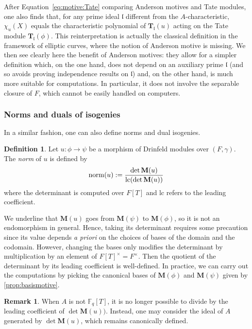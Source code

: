 \documentclass[11pt]{article}
\theoremstyle{definition}
\newtheorem{definition}[theorem]{Definition}
\newtheorem{remark}[theorem]{Remark}
\newcommand\Fq{\mathbb{F}_q}
\newcommand{\MM}{\mathbf{M}}
\newcommand{\TT}{\mathbf{T}}
\begin{document}
After Equation~\eqref{eq:motive:Tate} comparing Anderson motives and
Tate modules, one also finds that, for any prime ideal $\mathfrak l$
different from the $A$-characteristic, $\chi_u(X)$ equals the 
characteristic polynomial of $\TT_{\mathfrak l}(u)$ acting on the 
Tate module $\TT_{\mathfrak l}(\phi)$.
This reinterpretation is actually the classical definition in the framework of elliptic curves, where the notion of Anderson motive is
missing. We then see clearly here the benefit of Anderson motives: they allow for a simpler definition which, on the one hand, does
not depend on an auxiliary prime $\mathfrak l$ (and so avoids 
proving independence results on $\mathfrak l$) and, on the other
hand, is much more suitable for computations. In particular, it 
does not involve the separable closure of $F$, which cannot be
easily handled on computers.



\subsubsection{Norms and duals of isogenies}
\label{sssec:norm-dual}

In a similar fashion, one can also define norms and dual isogenies.

\begin{definition}
\label{def:normisogeny}
Let $u : \phi \to \psi$ be a morphism of Drinfeld modules over
$(F,\gamma)$. The \emph{norm} of $u$ is defined by
$$\text{norm}(u) := \frac{\det \MM(u)}{\text{\text{lc}}(\det \MM(u))}$$
where the determinant is computed over $F[T]$ and $\text{lc}$ refers to
the leading coefficient.
\end{definition}

We underline that $\MM(u)$ goes from $\MM(\psi)$ to $\MM(\phi)$, so
it is not an endomorphism in general. Hence, taking its determinant
requires some precaution since its value depends \emph{a priori} on
the choices of bases of the domain and the codomain.
However, changing the bases only modifies the determinant by 
multiplication by an element of $F[T]^\times = F^\times$. Then the quotient of the determinant by its leading coefficient is well-defined.
In practice, we can carry out the computations by picking the
canonical bases of $\MM(\phi)$ and $\MM(\psi)$ given by
\cref{prop:basismotive}.

\begin{remark}
\label{rem:normideal}
When $A$ is not $\Fq[T]$, it is no longer possible to divide by the
leading coefficient of $\det \MM(u))$. Instead, one may consider the
ideal of $A$ generated by $\det \MM(u)$, which remains canonically
defined.
\end{remark}
\end{document}
